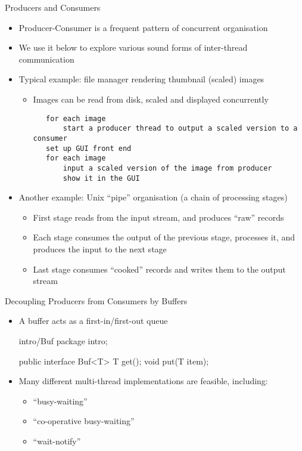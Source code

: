 \documentclass{concdistfoils}
\def\heading#1{\begin{cframed}[8.8in]{#1}\end{cframed}}
\begin{document}
\begin{slide}
\heading{Producers and Consumers}
\vfill
\begin{itemize}
\item Producer-Consumer is a frequent pattern of concurrent organisation
\item We use it below to explore various sound forms of inter-thread communication
\item Typical example: file manager rendering thumbnail (scaled) images
\begin{itemize}
\item Images can be read from disk, scaled and displayed concurrently
\begin{smaller}
\begin{verbatim}
   for each image
       start a producer thread to output a scaled version to a consumer
   set up GUI front end
   for each image
       input a scaled version of the image from producer
       show it in the GUI
\end{verbatim}
\end{smaller}
\end{itemize}
\item Another example: Unix ``pipe'' organisation (a chain of processing stages)
\begin{itemize}
\item First stage reads from the input stream, and produces ``raw'' records
\item Each stage consumes the output of the previous stage, 
      processes it, and produces the input to the next stage
\item Last stage consumes ``cooked'' records and writes them to the output stream
\end{itemize}
\end{itemize}
\end{slide}


\begin{slide}
\heading{Decoupling Producers from Consumers by Buffers}
\vfill
\begin{itemize}
\item A buffer acts as a first-in/first-out queue
\begin{hideclass}{intro/Buf}
package intro;
\end{hideclass}
\begin{class}{}
  public interface Buf<T> { T get(); void put(T item); }
\end{class}
\vfill 
\item Many different multi-thread implementations are feasible, including:
\begin{itemize}
\item ``busy-waiting''
\item ``co-operative busy-waiting''
\item ``wait-notify''
\end{itemize}
\end{itemize}
\end{slide}
\end{document}
